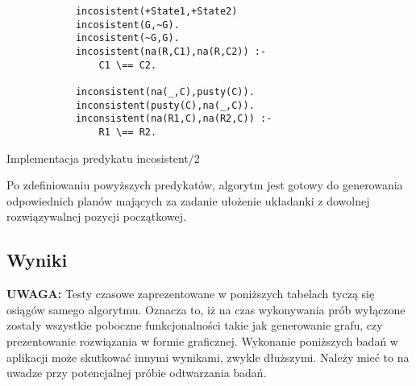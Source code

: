     \begin{listing}[H]
        \begin{verbatim}
            incosistent(+State1,+State2)
            incosistent(G,~G).
            incosistent(~G,G).
            incosistent(na(R,C1),na(R,C2)) :-
                C1 \== C2.
            
            inconsistent(na(_,C),pusty(C)).
            inconsistent(pusty(C),na(_,C)).
            inconsistent(na(R1,C),na(R2,C)) :-
                R1 \== R2.
        \end{verbatim}
    \caption{Implementacja predykatu incosistent/2}
    \end{listing}

    Po zdefiniowaniu powyższych predykatów, algorytm jest gotowy do generowania odpowiednich planów mających za zadanie ułożenie 
    układanki z dowolnej rozwiązywalnej pozycji początkowej.
    \subsection{Wyniki}

    \textbf{UWAGA:} Testy czasowe zaprezentowane w poniższych tabelach tyczą się osiągów samego algorytmu. Oznacza to, iż na czas wykonywania prób
    wyłączone zostały wszystkie poboczne funkcjonalności takie jak generowanie grafu, czy prezentowanie rozwiązania w formie graficznej. 
    Wykonanie poniższych badań w aplikacji może skutkować innymi wynikami, zwykle dłuższymi. Należy mieć to na uwadze przy potencjalnej 
    próbie odtwarzania badań.

